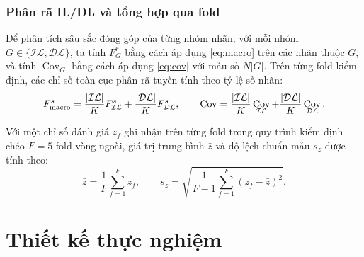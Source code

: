 \documentclass[11pt,a4paper]{article}
\newcommand{\IL}{\mathcal{IL}}
\newcommand{\DL}{\mathcal{DL}}
\DeclareMathOperator{\Cov}{Cov}
\begin{document}
\subsubsection{Phân rã IL/DL và tổng hợp qua fold}
Để phân tích sâu sắc đóng góp của từng nhóm nhãn, với mỗi nhóm $G \in \{\IL, \DL\}$, ta tính $F_G^r$ bằng cách áp dụng \eqref{eq:macro} trên các nhãn thuộc $G$, và tính $\Cov_G$ bằng cách áp dụng \eqref{eq:cov} với mẫu số $N|G|$. Trên từng fold kiểm định, các chỉ số toàn cục phân rã tuyến tính theo tỷ lệ số nhãn:
\begin{equation}
F_{\rm macro}^s = \frac{|\IL|}{K}F_{\IL}^s + \frac{|\DL|}{K}F_{\DL}^s, \qquad \Cov = \frac{|\IL|}{K}\Cov_{\IL} + \frac{|\DL|}{K}\Cov_{\DL}.
\label{eq:decomp}
\end{equation}

Với một chỉ số đánh giá $z_f$ ghi nhận trên từng fold trong quy trình kiểm định chéo $F=5$ fold vòng ngoài, giá trị trung bình $\bar z$ và độ lệch chuẩn mẫu $s_z$ được tính theo:
\begin{equation}
\bar z = \frac{1}{F}\sum_{f=1}^{F}z_f, \qquad s_z = \sqrt{\frac{1}{F-1}\sum_{f=1}^{F}(z_f - \bar z)^2}.
\label{eq:sd}
\end{equation}

\section{Thiết kế thực nghiệm}
\end{document}
